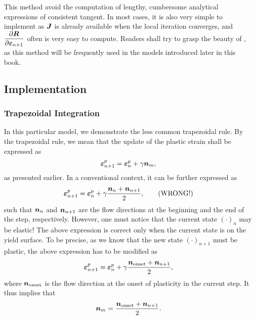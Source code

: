 This method avoid the computation of lengthy, cumbersome analytical expressions of consistent tangent. In most cases, it is also very simple to implement as $\bm{J}$ is already available when the local iteration converges, and $\dfrac{\partial{\bm{R}}}{\partial{\bm{\varepsilon}_{n+1}}}$ often is very easy to compute. Readers shall try to grasp the beauty of , as this method will be frequently used in the models introduced later in this book.
\subsection{Implementation}
\subsubsection{Trapezoidal Integration}
In this particular model, we demonstrate the less common trapezoidal rule.
By the trapezoidal rule, we mean that the update of the plastic strain shall be expressed as
\begin{gather}
    \bm{\varepsilon}^p_{n+1}=\bm{\varepsilon}^p_{n}+\gamma\bm{n}_{m},
\end{gather}
as presented earlier.
In a conventional context, it can be further expressed as
\begin{gather}
    \bm{\varepsilon}^p_{n+1}=\bm{\varepsilon}^p_{n}+\gamma\dfrac{\bm{n}_{n}+\bm{n}_{n+1}}{2},\qquad\text{(WRONG!)}
\end{gather}
such that $\bm{n}_{n}$ and $\bm{n}_{n+1}$ are the flow directions at the beginning and the end of the step, respectively.
However, one must notice that the current state $\left(\cdot\right)_n$ may be elastic!
The above expression is correct only when the current state is on the yield surface.
To be precise, as we know that the new state $\left(\cdot\right)_{n+1}$ must be plastic, the above expression has to be modified as
\begin{gather}
    \bm{\varepsilon}^p_{n+1}=\bm{\varepsilon}^p_{n}+\gamma\dfrac{\bm{n}_\text{onset}+\bm{n}_{n+1}}{2},
\end{gather}
where $\bm{n}_\text{onset}$ is the flow direction at the onset of plasticity in the current step.
It thus implies that
\begin{gather}
    \bm{n}_{m}=\dfrac{\bm{n}_\text{onset}+\bm{n}_{n+1}}{2}.
\end{gather}

